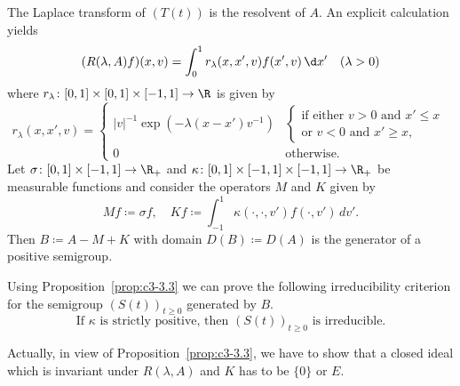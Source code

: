 \begin{examples}
\begin{enumerate}[(a), wide]
	The Laplace transform of $(T(t))$ is the resolvent of $A$.
	An explicit calculation yields
	\begin{equation}\label{eq:c3-3.5}
		(R(\lambda,A)f)(x,v) = \int_{0}^{1} r_{\lambda}(x,x',v)f(x',v)\,\d x' \quad (\lambda > 0)
	\end{equation}
	where $r_{\lambda} \colon [0,1] \times [0,1] \times [-1,1] \to \R $ is given by
	\begin{equation*}\label{eq:c3-r_lambda}
		r_{\lambda}(x,x',v) = \begin{cases}
			|v|^{-1}\exp(-\lambda(x-x')v^{-1}) & 
			\begin{cases}\text{if either } v>0 \text{ and } x'\leq x \\
		    \text{or } v<0 \text{ and } x'\geq x, 
		    \end{cases}\\
			0 & \text{otherwise}.
		\end{cases}
	\end{equation*}
	Let $\sigma \colon [0,1]\times[-1,1] \to \R _{+}$ and $\kappa \colon [0,1]\times[-1,1]\times[-1,1] \to \R _{+}$ be measurable functions and consider the operators $M$ and $K$ given by
	\begin{equation}\label{eq:c3-3.6}
		Mf \coloneqq \sigma f, \quad Kf \coloneqq \int_{-1}^{1} \kappa(\cdot,\cdot,v')f(\cdot,v')\,dv'.
	\end{equation}
	Then $B \coloneqq A - M + K$ with domain $D(B) \coloneqq D(A)$ is the generator of a positive semigroup.
	
	Using Proposition~\ref{prop:c3-3.3} we can prove the following irreducibility criterion for the semigroup $(S(t))_{t\geq 0}$ generated by $B$.
	\begin{equation}\label{eq:c3-3.7}
		\text{If } \kappa \text{ is strictly positive, then } (S(t))_{t\geq 0} \text{ is irreducible.}
	\end{equation}
	
	Actually, in view of Proposition~\ref{prop:c3-3.3}, we have to show that a closed ideal which is invariant under $R(\lambda,A)$ and $K$ has to be $\{0\}$ or $E$.
	

\end{enumerate}
\end{examples}
